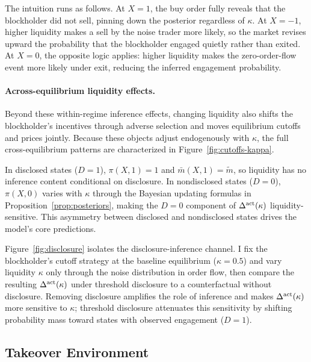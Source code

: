 \documentclass[11pt]{article}
\newcommand{\1}{\mathbf{1}}
\begin{document}
The intuition runs as follows. At $X=1$, the buy order fully reveals that the blockholder did not sell, pinning down the posterior regardless of $\kappa$. At $X=-1$, higher liquidity makes a sell by the noise trader more likely, so the market revises upward the probability that the blockholder engaged quietly rather than exited. At $X=0$, the opposite logic applies: higher liquidity makes the zero-order-flow event more likely under exit, reducing the inferred engagement probability.

\paragraph{Across-equilibrium liquidity effects.}
Beyond these within-regime inference effects, changing liquidity also shifts the blockholder's incentives through adverse selection and moves equilibrium cutoffs and prices jointly. Because these objects adjust endogenously with $\kappa$, the full cross-equilibrium patterns are characterized in Figure~\ref{fig:cutoffs-kappa}.

In disclosed states ($D=1$), $\pi(X,1)=1$ and $\bar{m}(X,1)=\tilde{m}$, so liquidity has no inference content conditional on disclosure. In nondisclosed states ($D=0$), $\pi(X,0)$ varies with $\kappa$ through the Bayesian updating formulas in Proposition~\ref{prop:posteriors}, making the $D=0$ component of $\Delta^{\textup{act}}(\kappa)$ liquidity-sensitive. This asymmetry between disclosed and nondisclosed states drives the model's core predictions.

Figure~\ref{fig:disclosure} isolates the disclosure-inference channel. I fix the blockholder's cutoff strategy at the baseline equilibrium ($\kappa=0.5$) and vary liquidity $\kappa$ only through the noise distribution in order flow, then compare the resulting $\Delta^{\textup{act}}(\kappa)$ under threshold disclosure to a counterfactual without disclosure. Removing disclosure amplifies the role of inference and makes $\Delta^{\textup{act}}(\kappa)$ more sensitive to $\kappa$; threshold disclosure attenuates this sensitivity by shifting probability mass toward states with observed engagement ($D=1$).

%
\subsection{Takeover Environment}
%
\end{document}
